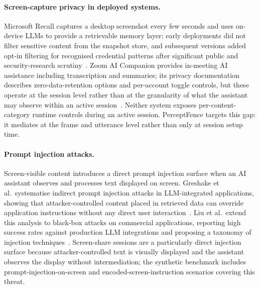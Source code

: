 \documentclass[sn-mathphys-num]{sn-jnl}
\begin{document}
\paragraph{Screen-capture privacy in deployed systems.}
Microsoft Recall captures a desktop screenshot every few seconds and uses
on-device LLMs to provide a retrievable memory layer; early deployments did not
filter sensitive content from the snapshot store, and subsequent versions added
opt-in filtering for recognised credential patterns after significant public and
security-research scrutiny~\cite{microsoft2024recall}.
Zoom AI Companion provides in-meeting AI assistance including transcription and
summaries; its privacy documentation describes zero-data-retention options and
per-account toggle controls, but these operate at the session level rather than
at the granularity of what the assistant may observe within an active
session~\cite{zoom2024ai}.
Neither system exposes per-content-category runtime controls during an active
session.
PerceptFence targets this gap: it mediates at the frame and utterance level
rather than only at session setup time.

\paragraph{Prompt injection attacks.}
Screen-visible content introduces a direct prompt injection surface when an AI
assistant observes and processes text displayed on screen.
Greshake et al.\ systematise indirect prompt injection attacks in
LLM-integrated applications, showing that attacker-controlled content placed in
retrieved data can override application instructions without any direct user
interaction~\cite{greshake2023indirect}.
Liu et al.\ extend this analysis to black-box attacks on commercial
applications, reporting high success rates against production LLM integrations
and proposing a taxonomy of injection techniques~\cite{liu2023prompt}.
Screen-share sessions are a particularly direct injection surface because
attacker-controlled text is visually displayed and the assistant observes the
display without intermediation; the synthetic benchmark includes
prompt-injection-on-screen and encoded-screen-instruction scenarios covering
this threat.
\end{document}
